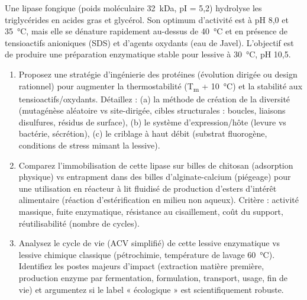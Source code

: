 \documentclass[11pt]{article}
\begin{document}
\begin{exercice}
Une lipase fongique (poids moléculaire \SI{32}{kDa}, pI = 5,2) hydrolyse les triglycérides en acides gras et glycérol. Son optimum d'activité est à pH 8,0 et \SI{35}{\celsius}, mais elle se dénature rapidement au-dessus de \SI{40}{\celsius} et en présence de tensioactifs anioniques (SDS) et d'agents oxydants (eau de Javel). L'objectif est de produire une préparation enzymatique stable pour lessive à \SI{30}{\celsius}, pH 10,5.
\begin{enumerate}
    \item Proposez une stratégie d'ingénierie des protéines (évolution dirigée ou design rationnel) pour augmenter la thermostabilité (T\textsubscript{m} + \SI{10}{\celsius}) et la stabilité aux tensioactifs/oxydants. Détaillez : (a) la méthode de création de la diversité (mutagénèse aléatoire vs site-dirigée, cibles structurales : boucles, liaisons disulfures, résidus de surface), (b) le système d'expression/hôte (levure vs bactérie, sécrétion), (c) le criblage à haut débit (substrat fluorogène, conditions de stress mimant la lessive).
    \item Comparez l'immobilisation de cette lipase sur billes de chitosan (adsorption physique) vs entrapment dans des billes d'alginate-calcium (piégeage) pour une utilisation en réacteur à lit fluidisé de production d'esters d'intérêt alimentaire (réaction d'estérification en milieu non aqueux). Critère : activité massique, fuite enzymatique, résistance au cisaillement, coût du support, réutilisabilité (nombre de cycles).
    \item Analysez le cycle de vie (ACV simplifié) de cette lessive enzymatique vs lessive chimique classique (pétrochimie, température de lavage \SI{60}{\celsius}). Identifiez les postes majeurs d'impact (extraction matière première, production enzyme par fermentation, formulation, transport, usage, fin de vie) et argumentez si le label « écologique » est scientifiquement robuste.
\end{enumerate}
\end{exercice}
\end{document}

